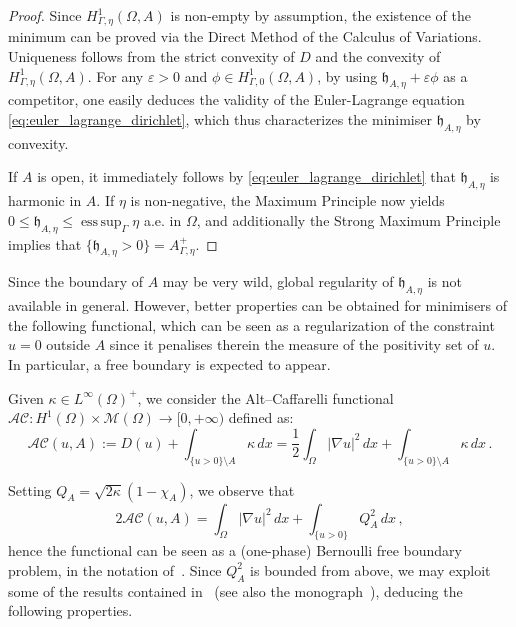\documentclass[a4paper,11pt,reqno]{amsart}
\numberwithin{equation}{section}
\theoremstyle{definition}
\theoremstyle{remark}
\DeclareMathOperator*{\esssup}{ess\, sup}
\begin{document}
\begin{proof}
    Since $H^1_{\Gamma,\eta}(\Omega, A)$ is non-empty by assumption, the existence of the minimum can be proved via the Direct Method of the Calculus of Variations.
    Uniqueness follows from the strict convexity of $D$ and the convexity of $H^1_{\Gamma,\eta}(\Omega, A)$.
    For any $\varepsilon > 0$ and $\phi \in H^1_{\Gamma,0}(\Omega, A)$, by using $\mathfrak{h}_{A,\eta}+\varepsilon \phi$ as a competitor, one easily deduces the validity of the Euler-Lagrange equation \eqref{eq:euler_lagrange_dirichlet}, which thus characterizes the minimiser $\mathfrak{h}_{A,\eta}$ by convexity. 
    
    If $A$ is open, it immediately follows by \eqref{eq:euler_lagrange_dirichlet} that $\mathfrak{h}_{A,\eta}$ is harmonic in $A$. If $\eta$ is non-negative, the Maximum Principle now yields $0\leq \mathfrak{h}_{A,\eta} \leq \esssup_\Gamma\eta$ a.e. in $\Omega$, and additionally the Strong Maximum Principle implies that $\{\mathfrak{h}_{A,\eta}>0\}=A^+_{\Gamma,\eta}$.
\end{proof}

Since the boundary of $A$ may be very wild, global regularity of $\mathfrak{h}_{A,\eta}$ is not available in general. However, better properties can be obtained for minimisers of the following functional, which can be seen as a regularization of the constraint $u=0$ outside $A$ since it penalises therein the measure of the positivity set of $u$. In particular, a free boundary is expected to appear.

Given $\kappa\in L^\infty(\Omega)^+$, we consider the Alt--Caffarelli functional $\mathcal{AC}\colon H^1(\Omega)\times\mathcal M(\Omega)\to [0,+\infty)$ defined as:
\begin{equation}\label{eq:E}
\mathcal{AC}(u,A):=D(u)+\int_{\{u>0\}\setminus A} \kappa  \,dx = \frac 12 \int_\Omega |\nabla u|^2 \, dx+\int_{\{u>0\}\setminus A} \kappa  \,dx \, .
\end{equation}

Setting $Q_A=\sqrt{2\kappa}(1-\chi_A)$, we observe that
\[
    2\mathcal{AC}(u,A)= \int_\Omega |\nabla u|^2 \, dx+\int_{\{u>0\}} Q_A^2  \,dx \,,
\]
hence the functional can be seen as a (one-phase) Bernoulli free boundary problem, in the notation of~\cite{ALT1981}.
Since $Q_A^2$ is bounded from above, we may exploit some of the results contained in~\cite{ALT1981} (see also the monograph~\cite{Velichkov}), deducing the following properties.
\end{document}
